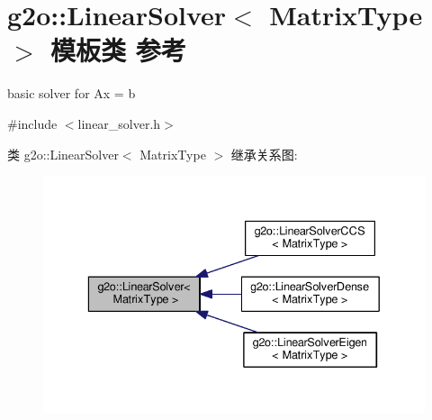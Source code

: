 \hypertarget{classg2o_1_1LinearSolver}{\section{g2o\-:\-:Linear\-Solver$<$ Matrix\-Type $>$ 模板类 参考}
\label{classg2o_1_1LinearSolver}
}


basic solver for Ax = b  




{\ttfamily \#include $<$linear\-\_\-solver.\-h$>$}



类 g2o\-:\-:Linear\-Solver$<$ Matrix\-Type $>$ 继承关系图\-:
\nopagebreak
\begin{figure}[H]
\begin{center}
\leavevmode
\includegraphics[width=336pt]{classg2o_1_1LinearSolver__inherit__graph}
\end{center}
\end{figure}
